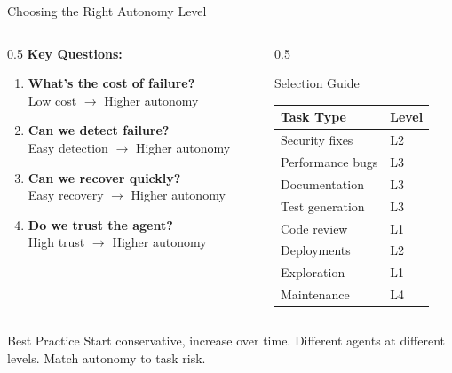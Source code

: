 \documentclass[aspectratio=169, 11pt]{beamer}
\begin{document}
\begin{frame}{Choosing the Right Autonomy Level}
    \begin{columns}[T]
        \begin{column}{0.5\textwidth}
            \textbf{Key Questions:}
            \begin{enumerate}
                \item \textbf{What's the cost of failure?}\\
                Low cost $\rightarrow$ Higher autonomy

                \item \textbf{Can we detect failure?}\\
                Easy detection $\rightarrow$ Higher autonomy

                \item \textbf{Can we recover quickly?}\\
                Easy recovery $\rightarrow$ Higher autonomy

                \item \textbf{Do we trust the agent?}\\
                High trust $\rightarrow$ Higher autonomy
            \end{enumerate}
        \end{column}
        \begin{column}{0.5\textwidth}
            \begin{block}{Selection Guide}
                \footnotesize
                \begin{tabular}{ll}
                    \textbf{Task Type} & \textbf{Level} \\
                    \midrule
                    Security fixes & L2 \\
                    Performance bugs & L3 \\
                    Documentation & L3 \\
                    Test generation & L3 \\
                    Code review & L1 \\
                    Deployments & L2 \\
                    Exploration & L1 \\
                    Maintenance & L4 \\
                \end{tabular}
            \end{block}
        \end{column}
    \end{columns}

    \vspace{0.3cm}
    \begin{alertblock}{Best Practice}
        Start conservative, increase over time. Different agents at different levels. Match autonomy to task risk.
    \end{alertblock}

\end{frame}
\end{document}
